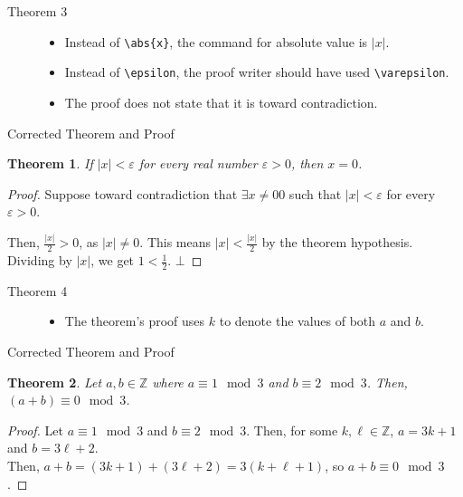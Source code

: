 \documentclass[9pt]{extarticle}
\newtheorem{theorem}{Theorem}
\newcommand{\Z}{\mathbb{Z}}
\begin{document}
  \begin{description}
    \item[Theorem 3] \hfill
      \begin{itemize}
        \item Instead of \verb|\abs{x}|, the command for absolute value is $|x|$.
        \item Instead of \verb|\epsilon|, the proof writer should have used \verb|\varepsilon|.
        \item The proof does not state that it is toward contradiction.
      \end{itemize}
  \end{description}
  \begin{problem}{Corrected Theorem and Proof}
    \begin{theorem}
      If $|x| < \varepsilon$ for every real number $\varepsilon > 0$, then $x = 0$.
    \end{theorem}
    \begin{proof}
      Suppose toward contradiction that $\exists x \neq 0 0$ such that $|x| < \varepsilon$ for every $\varepsilon > 0$.

      Then, $\frac{|x|}{2} > 0$, as $|x| \neq 0$. This means $|x| < \frac{|x|}{2}$ by the theorem hypothesis.\\

      Dividing by $|x|$, we get $1 < \frac{1}{2}$. $\bot$
    \end{proof}
  \end{problem}

  \begin{description}
    \item[Theorem 4]\hfill
      \begin{itemize}
        \item The theorem's proof uses $k$ to denote the values of both $a$ and $b$.
      \end{itemize}
  \end{description}
  \begin{problem}{Corrected Theorem and Proof}
    \begin{theorem}
      Let $a,b\in\Z$ where $a\equiv 1 \mod 3$ and $b\equiv 2 \mod 3$. Then, $(a+b)\equiv 0 \mod 3$.
    \end{theorem}
    \begin{proof}
      Let $a\equiv 1 \mod 3$ and $b\equiv 2 \mod 3$. Then, for some $k,\ell\in\Z$, $a = 3k+1$ and $b = 3\ell + 2$.\\

      Then, $a+b = (3k+1) + (3\ell + 2) = 3(k + \ell + 1)$, so $a + b \equiv 0 \mod 3$.
    \end{proof}
  \end{problem}
\end{document}
